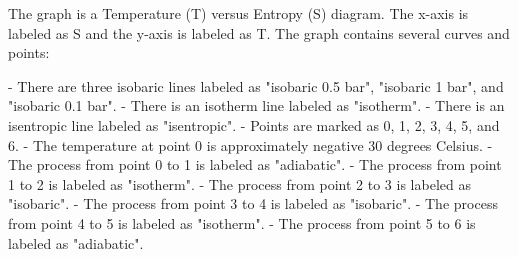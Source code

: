 The graph is a Temperature (T) versus Entropy (S) diagram. The x-axis is labeled as S and the y-axis is labeled as T. The graph contains several curves and points:

- There are three isobaric lines labeled as "isobaric 0.5 bar", "isobaric 1 bar", and "isobaric 0.1 bar".
- There is an isotherm line labeled as "isotherm".
- There is an isentropic line labeled as "isentropic".
- Points are marked as 0, 1, 2, 3, 4, 5, and 6.
- The temperature at point 0 is approximately negative 30 degrees Celsius.
- The process from point 0 to 1 is labeled as "adiabatic".
- The process from point 1 to 2 is labeled as "isotherm".
- The process from point 2 to 3 is labeled as "isobaric".
- The process from point 3 to 4 is labeled as "isobaric".
- The process from point 4 to 5 is labeled as "isotherm".
- The process from point 5 to 6 is labeled as "adiabatic".